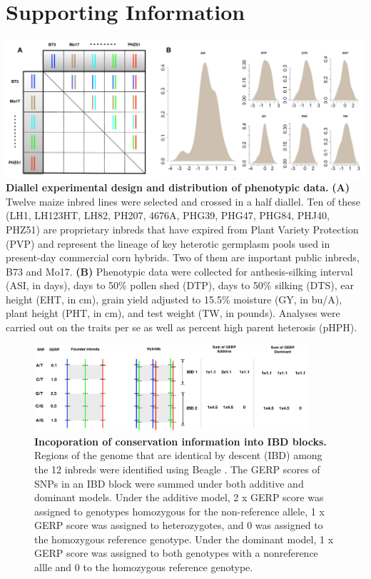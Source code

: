\documentclass[9pt,twocolumn,twoside]{gsajnl}
\newcommand{\beginsupplement}{%
        \setcounter{table}{0}
        \renewcommand{\thetable}{S\arabic{table}}%
        \setcounter{figure}{0}
        \renewcommand{\thefigure}{S\arabic{figure}}%
     }
\begin{document}
\clearpage



\pagebreak
\beginsupplement
\section*{Supporting Information}


\begin{center}\vspace{1cm}
\includegraphics[width=0.8\linewidth]{pvp.pdf}
{\color{black} \textbf{Diallel experimental design and distribution of phenotypic data.}
\textbf{(A)} Twelve maize inbred lines were selected and crossed in a half diallel. Ten of these (LH1, LH123HT, LH82, PH207, 4676A, PHG39, PHG47, PHG84, PHJ40, PHZ51) are proprietary inbreds that have expired from Plant Variety Protection (PVP) and represent the lineage of key heterotic germplasm pools used in present-day commercial corn hybrids. Two of them are important public inbreds, B73 and Mo17. \textbf{(B)} Phenotypic data were collected for anthesis-silking interval (ASI, in days), days to 50\% pollen shed (DTP), days to 50\% silking (DTS), ear height (EHT, in cm), grain yield adjusted to 15.5\% moisture (GY, in bu/A), plant height (PHT, in cm), and test weight (TW, in pounds). Analyses were carried out on the traits per se as well as percent high parent heterosis (pHPH).
}
\label{fig:pvp-pheno}
\end{center}\vspace{1cm}




\begin{figure}[here]
\includegraphics[width=0.9\textwidth]{gerpIBD.pdf}
\caption{
\textbf{Incoporation of conservation information into IBD blocks.}
Regions of the genome that are identical by descent (IBD) among the 12 inbreds were identified using Beagle \citep{Browning2009}.  The GERP scores of SNPs in an IBD block were summed under both additive and dominant models. Under the additive model, 2 x GERP score was assigned to genotypes homozygous for the non-reference allele, 1 x GERP score was assigned to heterozygotes, and 0 was assigned to the homozygous reference genotype. Under the dominant model, 1 x GERP score was assigned to both genotypes with a nonreference allle and 0 to the homozygous reference genotype.}
\label{fig:gerpibd}
\end{figure}
\end{document}
